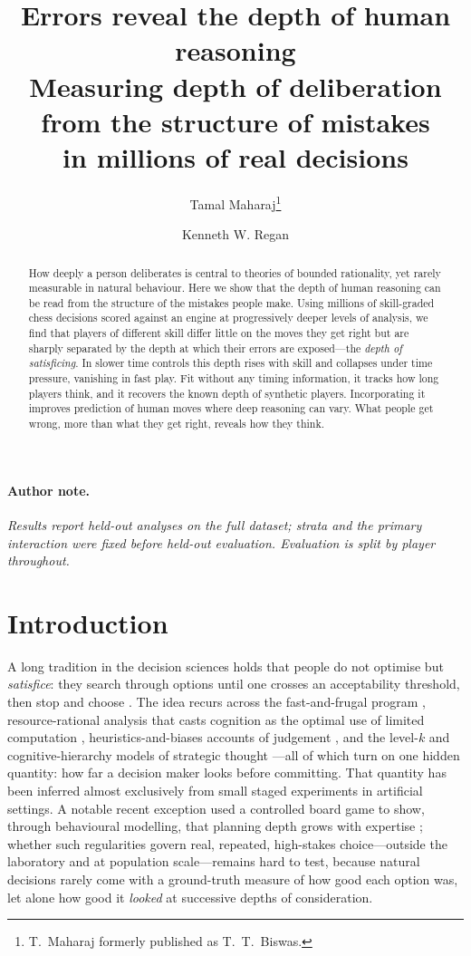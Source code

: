 \documentclass[11pt]{article}
\title{\textbf{Errors reveal the depth of human reasoning}\\[2pt]
\large Measuring depth of deliberation from the structure of mistakes\\ in millions of real decisions}
\author{Tamal Maharaj\thanks{T.\ Maharaj formerly published as T.\ T.\ Biswas.} \and Kenneth W. Regan}
\date{}
\begin{document}
\maketitle

\paragraph{Author note.}\textit{Results report held-out analyses on the full dataset; strata
and the primary interaction were fixed before held-out evaluation. Evaluation is split by
player throughout.}

\begin{abstract}
\noindent How deeply a person deliberates is central to theories of bounded
rationality, yet rarely measurable in natural behaviour. Here we show that the depth of human
reasoning can be read from the structure of the mistakes people make. Using millions of
skill-graded chess decisions scored against an engine at progressively deeper levels of
analysis, we find that players of different skill differ little on the moves they get right but
are sharply separated by the depth at which their errors are exposed---the \emph{depth of
satisficing}. In slower time controls this depth rises with skill and collapses under time
pressure, vanishing in fast play. Fit without any timing information, it tracks how long players
think, and it recovers the known depth of synthetic players. Incorporating it improves
prediction of human moves where deep reasoning can vary. What people get wrong, more than what
they get right, reveals how they think.
\end{abstract}

\section{Introduction}
A long tradition in the decision sciences holds that people do not optimise but
\emph{satisfice}: they search through options until one crosses an acceptability threshold,
then stop and choose \citep{simon1955,simon1956}. The idea recurs across the fast-and-frugal
program \citep{gigerenzer1996}, resource-rational analysis that casts cognition as the optimal
use of limited computation \citep{russell1991,griffiths2015,lieder2020}, heuristics-and-biases
accounts of judgement \citep{tversky1974,kahneman1979}, and the \mbox{level-$k$} and
cognitive-hierarchy models of strategic thought \citep{stahl1995,nagel1995,costagomes2001,camerer2004,costagomes2006,crawford2013,strzalecki2014}---all of which turn on one hidden
quantity: how far a decision maker looks before committing. That quantity has been inferred
almost exclusively from small staged experiments in artificial settings. A notable recent
exception used a controlled board game to show, through behavioural modelling, that planning
depth grows with expertise \citep{callaway2022,vanopheusden2023}; whether such regularities
govern real, repeated, high-stakes choice---outside the laboratory and at population
scale---remains hard to test, because natural decisions rarely come with a ground-truth
measure of how good each option was, let alone how good it \emph{looked} at successive depths
of consideration.
\end{document}
